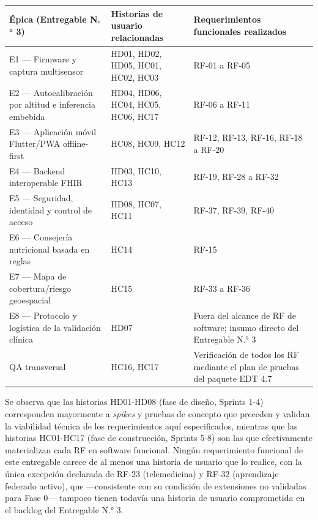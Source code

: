\documentclass[11pt,a4paper]{article}
\begin{document}
{\small
\begin{longtable}[]{@{}
  >{\raggedright\arraybackslash}p{}
  >{\raggedright\arraybackslash}p{}
  >{\raggedright\arraybackslash}p{}@{}}
\toprule\noalign{}
\begin{minipage}[b]{\linewidth}\raggedright
Épica (Entregable N.° 3)
\end{minipage} & \begin{minipage}[b]{\linewidth}\raggedright
Historias de usuario relacionadas
\end{minipage} & \begin{minipage}[b]{\linewidth}\raggedright
Requerimientos funcionales realizados
\end{minipage} \\
\midrule\noalign{}
\endhead
\bottomrule\noalign{}
\endlastfoot
E1 --- Firmware y captura multisensor & HD01, HD02, HD05, HC01, HC02, HC03 & RF-01 a RF-05 \\
E2 --- Autocalibración por altitud e inferencia embebida & HD04, HD06, HC04, HC05, HC06, HC17 & RF-06 a RF-11 \\
E3 --- Aplicación móvil Flutter/PWA offline-first & HC08, HC09, HC12 & RF-12, RF-13, RF-16, RF-18 a RF-20 \\
E4 --- Backend interoperable FHIR & HD03, HC10, HC13 & RF-19, RF-28 a RF-32 \\
E5 --- Seguridad, identidad y control de acceso & HD08, HC07, HC11 & RF-37, RF-39, RF-40 \\
E6 --- Consejería nutricional basada en reglas & HC14 & RF-15 \\
E7 --- Mapa de cobertura/riesgo geoespacial & HC15 & RF-33 a RF-36 \\
E8 --- Protocolo y logística de la validación clínica & HD07 & Fuera del alcance de RF de software; insumo directo del Entregable N.° 3 \\
QA transversal & HC16, HC17 & Verificación de todos los RF mediante el plan de pruebas del paquete EDT 4.7 \\
\end{longtable}
}

Se observa que las historias HD01-HD08 (fase de diseño, Sprints 1-4) corresponden mayormente a \emph{spikes} y pruebas de concepto que preceden y validan la viabilidad técnica de los requerimientos aquí especificados, mientras que las historias HC01-HC17 (fase de construcción, Sprints 5-8) son las que efectivamente materializan cada RF en software funcional. Ningún requerimiento funcional de este entregable carece de al menos una historia de usuario que lo realice, con la única excepción declarada de RF-23 (telemedicina) y RF-32 (aprendizaje federado activo), que ---consistente con su condición de extensiones no validadas para Fase 0--- tampoco tienen todavía una historia de usuario comprometida en el backlog del Entregable N.° 3.
\end{document}
